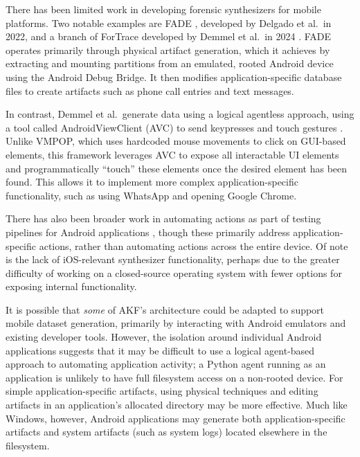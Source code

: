 \documentclass[letterpaper,12pt]{report}
\begin{document}
There has been limited work in developing forensic synthesizers for
mobile platforms. Two notable examples are FADE
\cite{ceballosdelgadoFADEForensicImage2022}, developed by Delgado et
al.~in 2022, and a branch of ForTrace developed by Demmel et al.~in 2024
\cite{demmelDataSynthesisGoing2024}. FADE operates primarily through
physical artifact generation, which it achieves by extracting and
mounting partitions from an emulated, rooted Android device using the
Android Debug Bridge. It then modifies application-specific database
files to create artifacts such as phone call entries and text messages.

In contrast, Demmel et al.~generate data using a logical agentless
approach, using a tool called AndroidViewClient (AVC) to send keypresses
and touch gestures \cite{demmelDataSynthesisGoing2024}. Unlike
VMPOP, which uses hardcoded mouse movements to click on GUI-based
elements, this framework leverages AVC to expose all interactable UI
elements and programmatically ``touch'' these elements once the desired
element has been found. This allows it to implement more complex
application-specific functionality, such as using WhatsApp and opening
Google Chrome.

There has also been broader work in automating actions as part of
testing pipelines for Android applications
\cite{janickiObstaclesOpportunitiesDeploying2012,nagowahNovelApproachAutomation2012,linares-vasquezHowDevelopersTest2017},
though these primarily address application-specific actions, rather than
automating actions across the entire device. Of note is the lack of
iOS-relevant synthesizer functionality, perhaps due to the greater
difficulty of working on a closed-source operating system with fewer
options for exposing internal functionality.

It is possible that \emph{some} of AKF's architecture could be adapted
to support mobile dataset generation, primarily by interacting with
Android emulators and existing developer tools. However, the isolation
around individual Android applications suggests that it may be difficult
to use a logical agent-based approach to automating application
activity; a Python agent running as an application is unlikely to have
full filesystem access on a non-rooted device. For simple
application-specific artifacts, using physical techniques and editing
artifacts in an application's allocated directory may be more effective.
Much like Windows, however, Android applications may generate both
application-specific artifacts and system artifacts (such as system
logs) located elsewhere in the filesystem.
\end{document}
